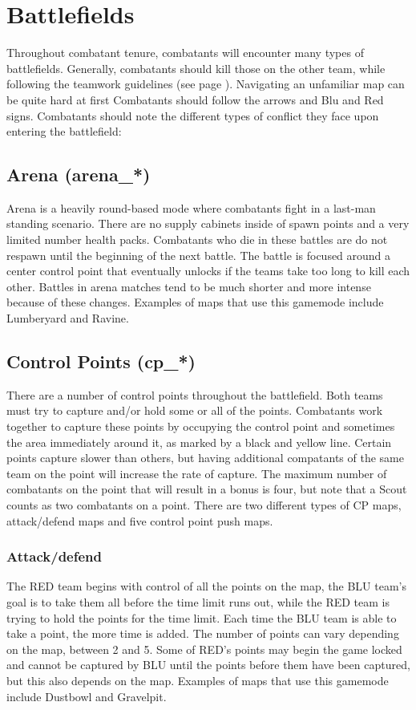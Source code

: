 \section{Battlefields}
Throughout combatant tenure, combatants will encounter many types of battlefields. Generally, combatants should kill those on the other team, while following the teamwork guidelines (see page \pageref{Team_Strategy}). Navigating an unfamiliar map can be quite hard at first   Combatants should  follow the arrows and Blu and Red signs. Combatants should note the different types of conflict they face upon entering the battlefield:

\subsection{Arena (arena\_*)}
Arena is a heavily round-based mode where combatants fight in a last-man standing scenario. There are no supply cabinets inside of spawn points and a very limited number health packs.  Combatants who die in these battles are do not respawn until the beginning of the next battle.   The battle is focused around a center control point that eventually unlocks if the teams take too long to kill each other. Battles in arena matches tend to be much shorter and more intense because of these changes. Examples of maps that use this gamemode include Lumberyard and Ravine.

\subsection{Control Points (cp\_*)}
There are a number of control points throughout the battlefield. Both teams must try to capture and/or hold some or all of the points. Combatants work together to capture these points by occupying the control point and sometimes the area immediately around it, as marked by a black and yellow line. Certain points capture slower than others, but having additional compatants of the same team on the point will increase the rate of capture. The maximum number of combatants on the point that will result in a bonus is four, but note that a Scout counts as two combatants on a point. There are two different types of CP maps, attack/defend maps and five control point push maps. 
  
\subsubsection{Attack/defend}
The RED team begins with control of all the points on the map, the BLU team's goal is to take them all before the time limit runs out, while the RED team is trying to hold the points for the time limit. Each time the BLU team is able to take a point, the more time is added. The number of points can vary depending on the map, between 2 and 5. Some of RED's points may begin the game locked and cannot be captured by BLU until the points before them have been captured, but this also depends on the map. Examples of maps that use this gamemode include Dustbowl and Gravelpit.

